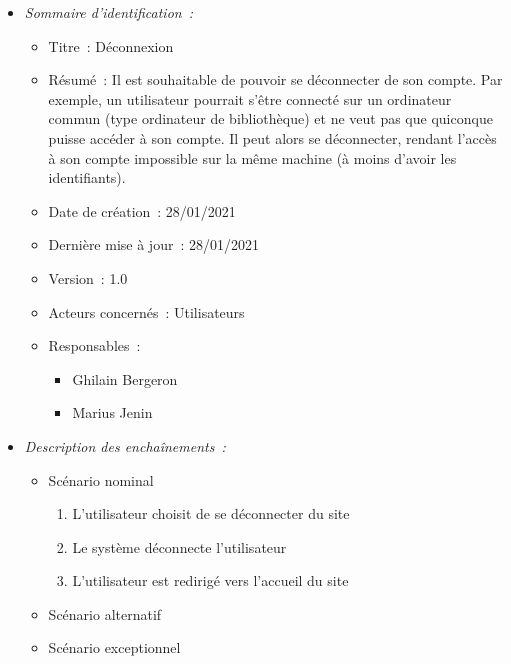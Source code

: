\begin{itemize}

\item \textit{Sommaire d'identification~:}

    \begin{itemize}
    
    \item Titre~: Déconnexion
    
    \item Résumé~: Il est souhaitable de pouvoir se déconnecter de son compte. Par exemple, un utilisateur pourrait s'être connecté sur un ordinateur commun (type ordinateur de bibliothèque) et ne veut pas que quiconque puisse accéder à son compte. Il peut alors se déconnecter, rendant l'accès à son compte impossible sur la même machine (à moins d'avoir les identifiants).
    
    \item Date de création~: 28/01/2021
    
    \item Dernière mise à jour~: 28/01/2021
    
    \item Version~: 1.0
    
    \item Acteurs concernés~: Utilisateurs
    
    \item Responsables~:
    
        \begin{itemize}
            \item Ghilain Bergeron
            \item Marius Jenin
        \end{itemize}
    
    \end{itemize}

\item \textit{Description des enchaînements~:}

    \begin{itemize}
        \item Scénario nominal
        \begin{enumerate}
            \item L'utilisateur choisit de se déconnecter du site
            \item Le système déconnecte l'utilisateur
            \item L'utilisateur est redirigé vers l'accueil du site
        \end{enumerate}
        \item Scénario alternatif
        \item Scénario exceptionnel
    \end{itemize}


\end{itemize}
